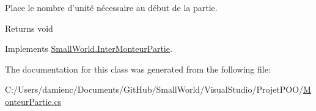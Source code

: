 Place le nombre d'unité nécessaire au début de la partie. 

\begin{DoxyReturn}{Returns}
void 
\end{DoxyReturn}


Implements \hyperlink{interface_small_world_1_1_inter_monteur_partie_a4ea7442b592d23a0f31e0d0020f124de}{Small\-World.\-Inter\-Monteur\-Partie}.



The documentation for this class was generated from the following file\-:\begin{DoxyCompactItemize}
\item 
C\-:/\-Users/damienc/\-Documents/\-Git\-Hub/\-Small\-World/\-Visual\-Studio/\-Projet\-P\-O\-O/\hyperlink{_monteur_partie_8cs}{Monteur\-Partie.\-cs}\end{DoxyCompactItemize}
